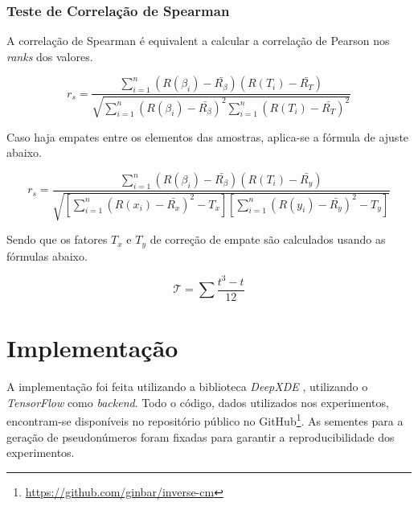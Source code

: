 \subsubsection{Teste de Correlação de Spearman}

A correlação de Spearman é equivalent a calcular a correlação de Pearson nos 
\textit{ranks} dos valores.

\begin{equation}
r_s = \frac{\sum_{i=1}^{n} (R(\beta_i) - \bar{R_{\beta}})(R(T_i) - \bar{R_{T}})}{\sqrt{\sum_{i=1}^{n} (R(\beta_i) - \bar{R_{\beta}})^2 \sum_{i=1}^{n} (R(T_i) - \bar{R_T})^2}}
\end{equation}

Caso haja empates entre os elementos das amostras, aplica-se a fórmula de ajuste
abaixo.

\begin{equation}
r_s = \frac{\sum_{i=1}^{n} (R(\beta_i) - \bar{R_{\beta}})(R(T_i) - \bar{R_y})}{\sqrt{\left[\sum_{i=1}^{n} (R(x_i) - \bar{R_x})^2 - T_x\right]\left[\sum_{i=1}^{n} (R(y_i) - \bar{R_y})^2 - T_y\right]}}
\end{equation}

Sendo que os fatores $T_x$ e $T_y$ de correção de empate são calculados
usando as fórmulas abaixo.  

\begin{equation}
\mathcal{T} = \sum \frac{t^3 - t}{12}
\end{equation}


\section{Implementação}

A implementação foi feita utilizando a biblioteca \textit{DeepXDE} \cite{lu-etal:21-deepxde}, 
utilizando o \textit{TensorFlow} \cite{tensorflow:16} como \textit{backend}. 
Todo o código, dados utilizados nos experimentos,
encontram-se disponíveis no repositório público no 
GitHub\footnote{\url{https://github.com/ginbar/inverse-cm}}.
As sementes para a geração de pseudonúmeros foram fixadas para garantir
a reproducibilidade dos experimentos.
